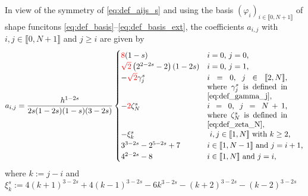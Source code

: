 \documentclass[10 pt]{article}
\newcommand\inter[1]{\llbracket #1\rrbracket}
\numberwithin{equation}{section}
\newcommand{\B}[1]{{\color{red} #1}}  %
\begin{document}
%
In view of the symmetry of \eqref{eq:def_aijs_s} and using the basis $(\varphi_i)_{i\in\inter{0,N+1}}$ of shape funcitons \eqref{eq:def_basis}--\eqref{eq:def_basis_ext}, the coefficients $a_{i,j}$ with $i,j\in\inter{0,N+1}$ and $j\geq i$ are given by
%
%
\begin{equation}\label{stiff:frac}
a_{i,j}= \frac{h^{1 - 2 s}}{2s(1-2s)(1-s)(3-2s)}
\begin{cases}
\B{8}(1-s) & \textnormal{$i=0$, $j=0$,} \\
\B{\sqrt{2}}\left(2^{2-2 s}-2\right)(1-2s) & \textnormal{$i=0$, $j=1$,} \\
-\B{\sqrt{2}}\gamma_j^s  & \parbox[t]{.3\columnwidth}{$i=0$, $j\in\inter{2,N}$, where $\gamma_j^s$ is defined in \eqref{eq:def_gamma_j},}\\
-\B{2}\zeta^s_{N}  & \parbox[t]{.3\columnwidth}{$i=0$, $j=N+1$, where $\zeta_N^s$ is defined in \eqref{eq:def_zeta_N},}\\
-\xi_k^s & \textnormal{ $i,j\in\inter{1,N}$ with $k\geq 2$,} \\
3^{3-2s}-2^{5-2s}+7 & \textnormal{$i\in\inter{1,N-1}$ and $j=i+1$,} \\
4^{2-2s}-8 & \textnormal{$i\in\inter{1,N}$ and $j=i$,}
\end{cases}
\end{equation}
where $k:=j-i$ and $\xi^s_k:=4(k+1)^{3-2s} + 4(k-1)^{3-2s}-6k^{3-2s}-(k+2)^{3-2s}-(k-2)^{3-2s}$
\end{document}
